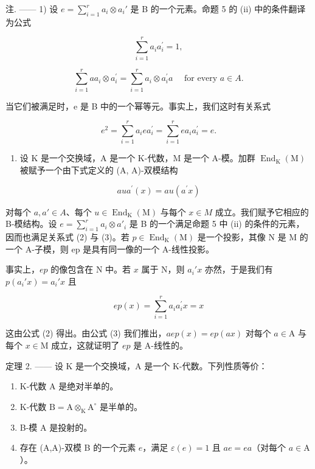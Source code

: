 注. —— 1) 设 \(e = \sum_{i=1}^{r} a_i \otimes a_i'\) 是 B 的一个元素。命题 5 的 (ii) 中的条件翻译为公式

\[
\sum_ {i = 1} ^ {r} a _ {i} a _ {i} ^ {\prime} = 1,\tag{2}
\]

\[
\sum_ {i = 1} ^ {r} a a _ {i} \otimes a _ {i} ^ {\prime} = \sum_ {i = 1} ^ {r} a _ {i} \otimes a _ {i} ^ {\prime} a \quad \text { for   every } a \in A.\tag{3}
\]

当它们被满足时，e 是 B 中的一个幂等元。事实上，我们这时有关系式

\[
e ^ {2} = \sum_ {i = 1} ^ {r} a _ {i} e a _ {i} ^ {\prime} = \sum_ {i = 1} ^ {r} e a _ {i} a _ {i} ^ {\prime} = e.
\]

\begin{enumerate}
\def\labelenumi{\arabic{enumi})}
\setcounter{enumi}{1}
\tightlist
\item
  设 K 是一个交换域，A 是一个 K-代数，M 是一个 A-模。加群 \(\operatorname{End}_{\mathrm{K}}(\mathrm{M})\) 被赋予一个由下式定义的 (A, A)-双模结构
\end{enumerate}

\[
a u a ^ {\prime} (x) = a u \left(a ^ {\prime} x\right)
\]

对每个 \(a, a' \in A\)、每个 \(u \in \operatorname{End}_{\mathrm{K}}(\mathrm{M})\) 与每个 \(x \in M\) 成立。我们赋予它相应的 B-模结构。设 \(e = \sum_{i=1}^{r} a_i \otimes a'_i\) 是 B 的一个满足命题 5 中 (ii) 的条件的元素，因而也满足关系式 (2) 与 (3)。若 \(p \in \operatorname{End}_{\mathrm{K}}(\mathrm{M})\) 是一个投影，其像 N 是 M 的一个 A-子模，则 ep 是具有同一像的一个 A-线性投影。

事实上，\(ep\) 的像包含在 N 中。若 \(x\) 属于 N，则 \(a_i' x\) 亦然，于是我们有 \(p(a_i' x) = a_i' x\) 且

\[
e p (x) = \sum_ {i = 1} ^ {r} a _ {i} a _ {i} ^ {\prime} x = x
\]

这由公式 (2) 得出。由公式 (3) 我们推出，\(aep(x) = ep(ax)\) 对每个 \(a \in \mathrm{A}\) 与每个 \(x \in \mathrm{M}\) 成立，这就证明了 \(ep\) 是 A-线性的。

定理 2. —— 设 K 是一个交换域，A 是一个 K-代数。下列性质等价：

\begin{enumerate}
\def\labelenumi{(\roman{enumi})}
\item
  K-代数 A 是绝对半单的。
\item
  K-代数 \(\mathrm{B} = \mathrm{A}\otimes_{\mathrm{K}}\mathrm{A}^{\circ}\) 是半单的。
\item
  B-模 A 是投射的。
\item
  存在 (A,A)-双模 B 的一个元素 \(e\)，满足 \(\varepsilon(e) = 1\) 且 \(ae = ea\)（对每个 \(a \in \mathrm{A}\)）。
\end{enumerate}

